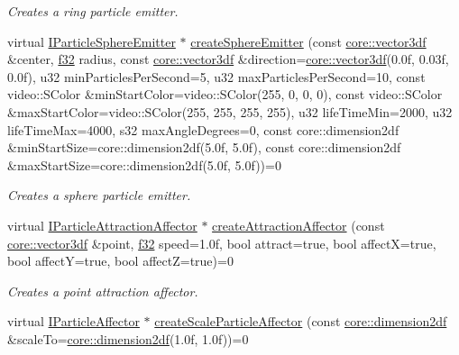 \begin{DoxyCompactItemize}
\begin{DoxyCompactList}\small\item\em Creates a ring particle emitter. \end{DoxyCompactList}\item 
virtual \hyperlink{classirr_1_1scene_1_1IParticleSphereEmitter}{I\+Particle\+Sphere\+Emitter} $\ast$ \hyperlink{classirr_1_1scene_1_1IParticleSystemSceneNode_abb4fe6b6346ede961805166fc5355fef}{create\+Sphere\+Emitter} (const \hyperlink{namespaceirr_1_1core_ae6e2b2a6c552833ebbd5b7463d03586b}{core\+::vector3df} \&center, \hyperlink{namespaceirr_a0277be98d67dc26ff93b1a6a1d086b07}{f32} radius, const \hyperlink{namespaceirr_1_1core_ae6e2b2a6c552833ebbd5b7463d03586b}{core\+::vector3df} \&direction=\hyperlink{namespaceirr_1_1core_ae6e2b2a6c552833ebbd5b7463d03586b}{core\+::vector3df}(0.\+0f, 0.\+03f, 0.\+0f), u32 min\+Particles\+Per\+Second=5, u32 max\+Particles\+Per\+Second=10, const video\+::\+S\+Color \&min\+Start\+Color=video\+::\+S\+Color(255, 0, 0, 0), const video\+::\+S\+Color \&max\+Start\+Color=video\+::\+S\+Color(255, 255, 255, 255), u32 life\+Time\+Min=2000, u32 life\+Time\+Max=4000, s32 max\+Angle\+Degrees=0, const core\+::dimension2df \&min\+Start\+Size=core\+::dimension2df(5.\+0f, 5.\+0f), const core\+::dimension2df \&max\+Start\+Size=core\+::dimension2df(5.\+0f, 5.\+0f))=0
\begin{DoxyCompactList}\small\item\em Creates a sphere particle emitter. \end{DoxyCompactList}\item 
virtual \hyperlink{classirr_1_1scene_1_1IParticleAttractionAffector}{I\+Particle\+Attraction\+Affector} $\ast$ \hyperlink{classirr_1_1scene_1_1IParticleSystemSceneNode_a833def146fb8b3d79bbbfbf69a9ed963}{create\+Attraction\+Affector} (const \hyperlink{namespaceirr_1_1core_ae6e2b2a6c552833ebbd5b7463d03586b}{core\+::vector3df} \&point, \hyperlink{namespaceirr_a0277be98d67dc26ff93b1a6a1d086b07}{f32} speed=1.\+0f, bool attract=true, bool affect\+X=true, bool affect\+Y=true, bool affect\+Z=true)=0
\begin{DoxyCompactList}\small\item\em Creates a point attraction affector. \end{DoxyCompactList}\item 
virtual \hyperlink{classirr_1_1scene_1_1IParticleAffector}{I\+Particle\+Affector} $\ast$ \hyperlink{classirr_1_1scene_1_1IParticleSystemSceneNode_a015692bb57e0b6dfff1de96975b3bc74}{create\+Scale\+Particle\+Affector} (const \hyperlink{namespaceirr_1_1core_a54f0e5b7416e6dce5a0f6213f00a580f}{core\+::dimension2df} \&scale\+To=\hyperlink{namespaceirr_1_1core_a54f0e5b7416e6dce5a0f6213f00a580f}{core\+::dimension2df}(1.\+0f, 1.\+0f))=0

\end{DoxyCompactItemize}
